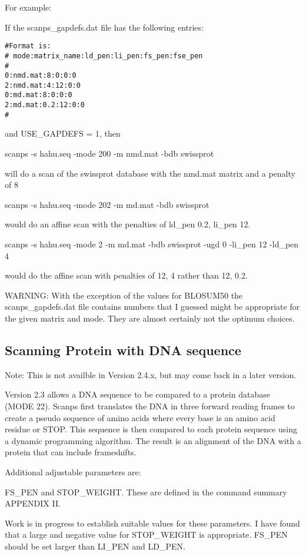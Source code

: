 \documentclass[12pt]{article}
\begin{document}
For example:

If the scanps\_gapdefs.dat file has the following entries:

\begin{scriptsize}
\begin{verbatim}
#Format is:
# mode:matrix_name:ld_pen:li_pen:fs_pen:fse_pen
#
0:nmd.mat:8:0:0:0
2:nmd.mat:4:12:0:0
0:md.mat:8:0:0:0
2:md.mat:0.2:12:0:0
#
\end{verbatim}
\end{scriptsize}

and USE\_GAPDEFS = 1, then 

scanps -s hahu.seq -mode 200 -m nmd.mat -bdb swissprot

will do a scan of the swissprot database with the nmd.mat matrix and a penalty of 8

scanps -s hahu.seq -mode 202 -m md.mat -bdb swissprot

would do an affine scan with the penalties of ld\_pen 0.2, li\_pen 12.

scanps -s hahu.seq -mode 2 -m md.mat -bdb swissprot -ugd 0 -li\_pen 12 -ld\_pen 4

would do the affine scan with penalties of 12, 4 rather than 12, 0.2. 


WARNING: With the exception of the values for BLOSUM50 the
scanps\_gapdefs.dat file contains numbers that I guessed might be
appropriate for the given matrix and mode.  They are almost certainly
not the optimum choices.  


\subsection{Scanning Protein with DNA sequence}

Note:  This is not availble in Version 2.4.x, but may come back in a later version.

Version 2.3 allows a DNA sequence to be compared to a protein
database (MODE 22).  Scanps first translates the DNA in three forward reading
frames to create a pseudo sequence of amino acids where every base is
an amino acid residue or STOP.  This sequence is then compared to each
protein sequence using a dynamic programming algorithm.  The result is
an alignment of the DNA with a protein that can include frameshifts.

Additional adjustable parameters are:

FS\_PEN and STOP\_WEIGHT.  These are defined in the command
summary APPENDIX II.

Work is in progress to establish suitable values for these parameters.
I have found that a large and negative value for STOP\_WEIGHT is
appropriate.  FS\_PEN  should be set larger than LI\_PEN and LD\_PEN.
\end{document}
